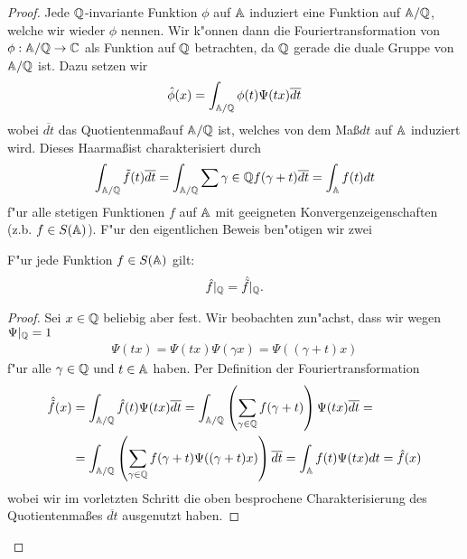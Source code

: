 	\begin{proof}
		Jede $\mathbb{Q}$-invariante Funktion $\phi$ auf $\mathbb{A}$ induziert eine Funktion auf $\mathbb{A}/\mathbb{Q}$, welche wir wieder $\phi$ nennen.
		Wir k"onnen dann die Fouriertransformation von $\phi: \mathbb{A}/\mathbb{Q} \rightarrow \mathbb{C}$ als Funktion auf $\mathbb{Q}$ betrachten, da $\mathbb{Q}$ gerade die duale Gruppe von $\mathbb{A}/\mathbb{Q}$ ist. Dazu setzen wir
		\begin{align*}
			\hat{\phi}(x) = \int_{\mathbb{A}/\mathbb{Q}}\phi(t)\Psi(tx)\overline{dt}
		\end{align*}
		wobei $\overline{dt}$ das Quotientenma\ss auf $\mathbb{A}/\mathbb{Q}$ ist, welches von dem Ma\ss $dt$ auf $\mathbb{A}$ induziert wird. Dieses Haarma\ss ist charakterisiert durch
		\begin{align*}
			\int_{\mathbb{A}/\mathbb{Q}}\tilde{f}(t)\overline{dt} =
			\int_{\mathbb{A}/\mathbb{Q}}\sum{\gamma \in \mathbb{Q}}f(\gamma+t)\overline{dt} =
			\int_{\mathbb{A}} f(t)dt
		\end{align*}
		f"ur alle stetigen Funktionen $f$ auf $\mathbb{A}$ mit geeigneten Konvergenzeigenschaften (z.b. $f\in S(\mathbb{A})$). F"ur den eigentlichen Beweis ben"otigen wir zwei
		
		\begin{lemma}
			F"ur jede Funktion $f \in S(\mathbb{A})$ gilt:
			\begin{align*}
				\hat{f}|_{\mathbb{Q}} = \hat{\tilde{f}}|_{\mathbb{Q}}.
			\end{align*}
		\end{lemma}
		\begin{proof}
			Sei $x \in \mathbb{Q}$ beliebig aber fest. Wir beobachten zun"achst, dass wir wegen $\Psi|_{\mathbb{Q}} =1$
			\begin{align*}
				\Psi(tx)= \Psi(tx)\Psi(\gamma x)=\Psi((\gamma + t) x)
			\end{align*}
			f"ur alle $\gamma \in \mathbb{Q}$ und $t\in \mathbb{A}$ haben. Per Definition der Fouriertransformation
			\begin{align*}
				\hat{\tilde{f}}(x)	&= \int_{\mathbb{A} / \mathbb{Q}} {\hat{f}(t)\Psi(tx)\overline{dt}} 
									 = \int_{\mathbb{A} / \mathbb{Q}} \left(\sum_{\gamma \in \mathbb{Q}}{f(\gamma + t)}\right)\Psi(tx)\overline{dt} =\\
									&= \int_{\mathbb{A} / \mathbb{Q}} \left(\sum_{\gamma \in \mathbb{Q}}{f(\gamma + t)}\Psi((\gamma + t)x)\right)\overline{dt}
									 = \int_{\mathbb{A}} f(t)\Psi(tx)dt = \hat{f}(x)
			\end{align*}
			wobei wir im vorletzten Schritt die oben besprochene Charakterisierung des Quotientenmaßes $\overline{dt}$ ausgenutzt haben.
		\end{proof}
		

\end{proof}
